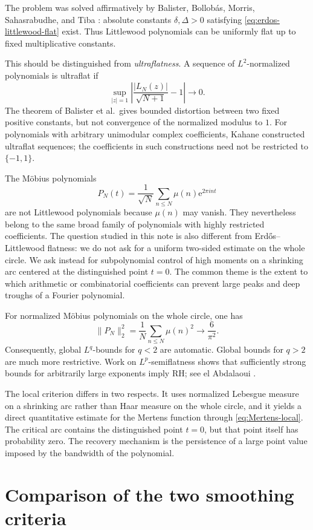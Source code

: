 \documentclass[11pt]{article}
\theoremstyle{remark}
\newcommand{\e}{\mathrm e}
\begin{document}
The problem was solved affirmatively by Balister, Bollob\'as, Morris,
Sahasrabudhe, and Tiba \cite{BalisterEtAl}: absolute constants
\(\delta,\Delta>0\) satisfying \eqref{eq:erdos-littlewood-flat} exist.
Thus Littlewood polynomials can be uniformly flat up to fixed
multiplicative constants.

This should be distinguished from \emph{ultraflatness}.  A sequence
of \(L^2\)-normalized polynomials is ultraflat if
\[
 \sup_{|z|=1}
 \left|
 \frac{|L_N(z)|}{\sqrt{N+1}}-1
 \right|
 \longrightarrow0.
\]
The theorem of Balister et al.\ gives bounded distortion between two
fixed positive constants, but not convergence of the normalized
modulus to \(1\).  For polynomials with arbitrary unimodular complex
coefficients, Kahane constructed ultraflat sequences; the coefficients
in such constructions need not be restricted to \(\{-1,1\}\).

The Möbius polynomials
\[
 P_N(t)=\frac1{\sqrt N}
 \sum_{n\leq N}\mu(n)\e^{2\pi int}
\]
are not Littlewood polynomials because \(\mu(n)\) may vanish.  They
nevertheless belong to the same broad family of polynomials with
highly restricted coefficients.  The question studied in this note
is also different from Erd\H{o}s--Littlewood flatness: we do not ask
for a uniform two-sided estimate on the whole circle.  We ask instead
for subpolynomial control of high moments on a shrinking arc centered
at the distinguished point \(t=0\).  The common theme is the extent
to which arithmetic or combinatorial coefficients can prevent large
peaks and deep troughs of a Fourier polynomial.

For normalized Möbius polynomials on the whole circle, one has
\[
 \|P_N\|_2^2
 =
 \frac1N\sum_{n\leq N}\mu(n)^2
 \longrightarrow\frac6{\pi^2}.
\]
Consequently, global \(L^q\)-bounds for \(q<2\) are automatic.  Global
bounds for \(q>2\) are much more restrictive.  Work on
\(L^p\)-semiflatness shows that sufficiently strong bounds for
arbitrarily large exponents imply RH; see el Abdalaoui
\cite{Abdalaoui}.

The local criterion differs in two respects.  It uses normalized
Lebesgue measure on a shrinking arc rather than Haar measure on the
whole circle, and it yields a direct quantitative estimate for the
Mertens function through \cref{eq:Mertens-local}.  The critical arc
contains the distinguished point \(t=0\), but that point itself has
probability zero.  The recovery mechanism is the persistence of a
large point value imposed by the bandwidth of the polynomial.


\section{Comparison of the two smoothing criteria}
\end{document}
